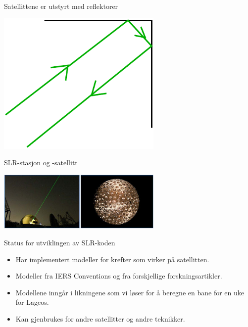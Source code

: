 \documentclass[12pt,table,t]{beamer}
\begin{document}
\begin{frame}{Satellittene er utstyrt med reflektorer}  

  \begin{center}
    \includegraphics[width=0.6\textwidth]{figure/laser}
  \end{center}
\end{frame}


\begin{frame}{SLR-stasjon og -satellitt}

  \begin{center}
    \includegraphics[width=0.6\textwidth]{figure/SLR}
  \end{center}
\end{frame}


\begin{frame}{Status for utviklingen av SLR-koden}

  \begin{itemize}
  \item Har implementert modeller for krefter som virker på satellitten.  
  \item Modeller fra IERS Conventions og fra forskjellige forskningsartikler.
  \item Modellene inngår i likningene som vi løser for å beregne en bane for en uke for Lageos. 
  \item Kan gjenbrukes for andre satellitter og andre teknikker. 
  \end{itemize}
\end{frame}
\end{document}
